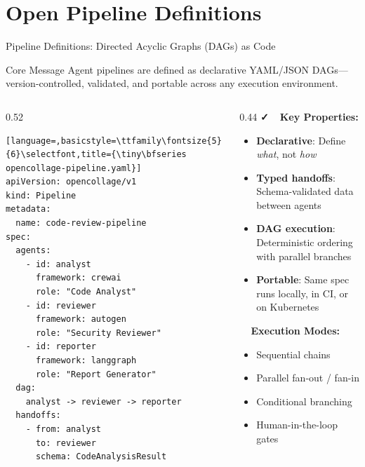 \section{Open Pipeline Definitions}

\begin{frame}[fragile]{\fontsize{10}{12}\selectfont Pipeline Definitions: Directed Acyclic Graphs (DAGs) as Code}
  \begin{block}{Core Message}
    \fontsize{6}{7}\selectfont
    Agent pipelines are defined as declarative YAML/JSON DAGs---version-controlled,
    validated, and portable across any execution environment.
  \end{block}

  \vspace{0.1cm}

  \begin{columns}[T]
    \begin{column}{0.52\textwidth}
      \begin{lstlisting}[language=,basicstyle=\ttfamily\fontsize{5}{6}\selectfont,title={\tiny\bfseries opencollage-pipeline.yaml}]
apiVersion: opencollage/v1
kind: Pipeline
metadata:
  name: code-review-pipeline
spec:
  agents:
    - id: analyst
      framework: crewai
      role: "Code Analyst"
    - id: reviewer
      framework: autogen
      role: "Security Reviewer"
    - id: reporter
      framework: langgraph
      role: "Report Generator"
  dag:
    analyst -> reviewer -> reporter
  handoffs:
    - from: analyst
      to: reviewer
      schema: CodeAnalysisResult
      \end{lstlisting}
    \end{column}
    \begin{column}{0.44\textwidth}
      \fontsize{6}{7}\selectfont
      \textbf{\faCheck\ \ Key Properties:}
      \begin{itemize}
        \item \textbf{Declarative}: Define \emph{what}, not \emph{how}
        \item \textbf{Typed handoffs}: Schema-validated data between agents
        \item \textbf{DAG execution}: Deterministic ordering with parallel branches
        \item \textbf{Portable}: Same spec runs locally, in CI, or on Kubernetes
      \end{itemize}

      \vspace{0.3cm}

      \textbf{\faCogs\ \ Execution Modes:}
      \begin{itemize}
        \item Sequential chains
        \item Parallel fan-out / fan-in
        \item Conditional branching
        \item Human-in-the-loop gates
      \end{itemize}
    \end{column}
  \end{columns}
\end{frame}
